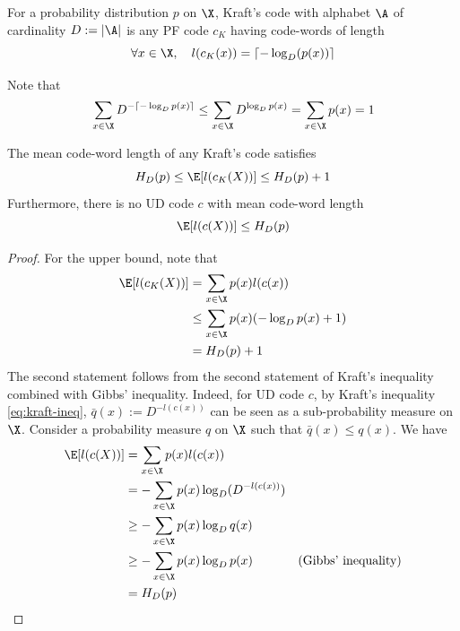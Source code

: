 \documentclass[toc, titlepaged]{../cs-classes/cs-classes}
\begin{document}
\begin{definition}
    For a probability distribution $p$ on $\X$, Kraft's code with alphabet $\A$ of cardinality $D:=|\A|$ is any PF code $c_K$ having code-words of length
    \begin{equation*}
        \forall x\in \X, \quad l(c_K(x))=\lceil -\log_D(p(x))\rceil
    \end{equation*}
\end{definition}

\begin{remark}
    Note that
    \begin{equation*}
        \sum_{x\in\X}D^{-\lceil-\log_Dp(x)\rceil}\leq \sum_{x\in\X}D^{\log_Dp(x)}=\sum_{x\in\X}p(x)=1
    \end{equation*}
\end{remark}

\begin{property}
    The mean code-word length of any Kraft's code satisfies
    \begin{equation}
        \label{eq:mean-length-kraft}
        H_D(p)\leq \E[l(c_K(X))]\leq H_D(p)+1
    \end{equation}
    Furthermore, there is no UD code $c$ with mean code-word length
    \begin{equation*}
        \E[l(c(X))]\leq H_D(p)
    \end{equation*}
\end{property}

\begin{proof}
    For the upper bound, note that
    \begin{equation*}
        \begin{aligned}
            \E[l(c_K(X))]&=\sum_{x\in\X}p(x)l(c(x))\\
            &\leq \sum_{x\in\X}p(x)(-\log_Dp(x)+1)\\
            &= H_D(p)+1
        \end{aligned}
    \end{equation*}
    The second statement follows from the second statement of Kraft's inequality combined with Gibbs' inequality. Indeed, for UD code $c$, by Kraft's inequality \eqref{eq:kraft-ineq}, $\bar{q}(x):=D^{-l(c(x))}$ can be seen as a sub-probability measure on $\X$. Consider a probability measure $q$ on $\X$ such that $\bar{q}(x)\leq q(x)$. We have
    \begin{equation*}
        \begin{aligned}
            \E[l(c(X))] &= \sum_{x\in\X}p(x)l(c(x))\\
            &= -\sum_{x\in\X}p(x)\log_D(D^{-l(c(x))})\\
            &\geq -\sum_{x\in\X}p(x)\log_Dq(x)\\
            &\geq -\sum_{x\in\X}p(x)\log_Dp(x) & \textnormal{(Gibbs' inequality)}\\
            &= H_D(p)
        \end{aligned}
    \end{equation*}
\end{proof}
\end{document}
